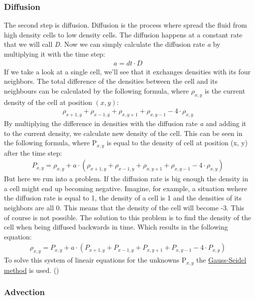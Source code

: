\documentclass[a4paper,12pt]{article}
\begin{document}
\subsubsection{Diffusion}
The second step is diffusion.
Diffusion is the process where spread the fluid from high density cells to low density cells.
The diffusion happens at a constant rate that we will call \textit{D}. 
Now we can simply calculate the diffusion rate \textit{a} by multiplying it with the time step:
\[
\begin{array}{ll}
  a = dt \cdot D
\end{array}
\]
If we take a look at a single cell, we'll see that it exchanges densities with its four neighbors.
The total difference of the densities between the cell and its neighbours can be calculated by the following formula,
where $\rho_{x, y}$ is the current density of the cell at position $(x, y)$:
\[
\begin{array}{ll}
	\rho_{x+1, y} + \rho_{x-1, y} + \rho_{x, y+1} + \rho_{x, y-1} - 4 \cdot \rho_{x, y}
\end{array}
\]
By multiplying the difference in densities with the diffusion rate \textit{a} and adding it to the current density, we calculate new density of the cell. 
This can be seen in the following formula, where P$_{x, y}$ is equal to the density of cell at position (x, y) after the time step:
\[
\begin{array}{ll}
	P_{x, y} = \rho_{x, y} + a \cdot (\rho_{x+1, y} + \rho_{x-1, y} + \rho_{x, y+1} + \rho_{x, y-1} - 4 \cdot \rho_{x, y})
\end{array}
\]
But here we run into a problem. If the diffusion rate is big enough the density in a cell might end up becoming negative.
Imagine, for example, a situation wehere the diffusion rate is equal to 1,  the density of a cell is 1 and the densities of its neighbors are all 0. This means that the density of the cell will become -3.
This of course is not possible.
The solution to this problem is to find the density of the cell when being diffused backwards in time. Which results in the following equation:
\[
\begin{array}{ll}
	\rho_{x, y} = P_{x, y} + a \cdot (P_{x+1, y} + P_{x-1, y} + P_{x, y+1} + P_{x, y-1} - 4 \cdot P_{x, y})
\end{array}	
\]
To solve this system of lineair equations for the unknowns P$_{x, y}$ the \href{https://en.wikipedia.org/wiki/Gauss–Seidel_method}{Gauss-Seidel method} is used. 
(\cite{josstam})

\subsubsection{Advection}
\end{document}
